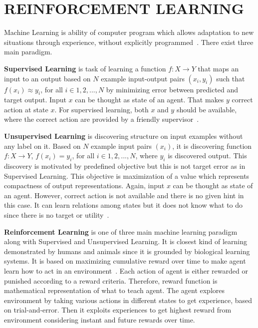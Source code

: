 \chapter{REINFORCEMENT LEARNING}
\label{chap:rl_chap}

Machine Learning is ability of computer program which allows 
adaptation to new situations through experience, 
without explicitly programmed~\cite{mitchell_machine_1997}. 
There exist three main paradigm. 

\textbf{Supervised Learning} is task of learning a function $f \colon X \rightarrow Y$ 
that maps an input to an output based on $N$ example input-output pairs $(x_i,y_i)$ 
such that $ f(x_i) \approx y_i$, for all $i \in {1,2,...,N}$ 
by minimizing error between predicted and target output. 
Input $x$ can be thought as state of an agent. 
That makes $y$ correct action at state $x$. 
For supervised learning, both $x$ and $y$ should be available, 
where the correct action are provided by a friendly supervisor~\cite{russell_artificial_nodate}. 

\textbf{Unsupervised Learning} is discovering structure on input examples without any label on it. 
Based on $N$ example input pairs $(x_i)$, 
it is discovering function $f \colon X \rightarrow Y$, $ f(x_i) = y_i$, for all $i \in {1,2,...,N} $, 
where $y_i$ is discovered output. 
This discovery is motivated by predefined objective but this is not target error as in Supervised Learning. 
This objective is maximization of a value which represents compactness of output representations. 
Again, input $x$ can be thought as state of an agent. 
However, correct action is not available and there is no given hint in this case. 
It can learn relations among states but it does not know what to do 
since there is no target or utility~\cite{russell_artificial_nodate}.
 
\textbf{Reinforcement Learning} is one of three main machine learning paradigm along with Supervised and Unsupervised Learning. 
It is closest kind of learning demonstrated by humans and animals 
since it is grounded by biological learning systems. 
It is based on maximizing cumulative reward over time to make agent 
learn how to act in an environment~\cite{sutton_reinforcement_1998}. 
Each action of agent is either rewarded or punished according to a reward criteria. 
Therefore, reward function is mathematical representation of what to teach agent. 
The agent explores environment by taking various actions in different states to get experience, based on trial-and-error. 
Then it exploits experiences to get highest reward from environment considering instant and future rewards over time. 

